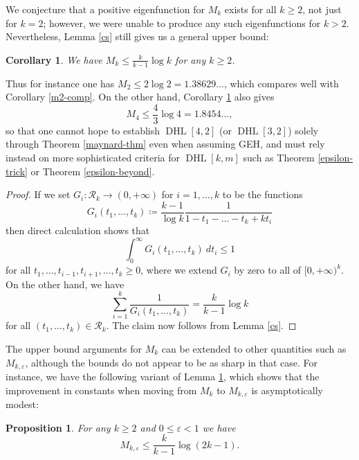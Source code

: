 \documentclass{bmcart}
\DeclareMathOperator*\DHL{DHL}
\theoremstyle{plain}
\newtheorem{proposition}[theorem]{Proposition}
\newtheorem{corollary}[theorem]{Corollary}
\theoremstyle{definition}
\newcommand\eps{\varepsilon}
\begin{document}
We conjecture that a positive eigenfunction for $M_k$ exists for all $k \geq 2$, not just for $k=2$; however, we were unable to produce any such eigenfunctions for $k>2$.  Nevertheless, Lemma \ref{cs} still gives us a general upper bound:

\begin{corollary}\label{mk-upper}  We have $M_k \leq \frac{k}{k-1} \log k$ for any $k \geq 2$.
\end{corollary}

Thus for instance one has $M_2 \leq 2 \log 2 = 1.38629\dots$, which compares well with Corollary \ref{m2-comp}.  On the other hand, Corollary \ref{mk-upper} also gives
$$ M_4 \leq \frac{4}{3} \log 4 = 1.8454\dots, $$
so that one cannot hope to establish $\DHL[4,2]$ (or $\DHL[3,2]$) solely through Theorem \ref{maynard-thm} even when assuming GEH, and must rely instead on more sophisticated criteria for $\DHL[k,m]$ such as Theorem \ref{epsilon-trick} or Theorem \ref{epsilon-beyond}. 

\begin{proof}  If we set $G_i: {\mathcal R}_k \to (0,+\infty)$ for $i=1,\dots,k$ to be the functions
$$ G_i(t_1,\dots,t_k) \coloneqq \frac{k-1}{\log k} \frac{1}{1-t_1-\dots-t_k + kt_i} $$
then direct calculation shows that
$$ \int_0^\infty G_i(t_1,\dots,t_k)\ dt_i \leq 1$$
for all $t_1,\dots,t_{i-1},t_{i+1},\dots,t_k \geq 0$, where we extend $G_i$ by zero to all of $[0,+\infty)^k$.  On the other hand, we have
$$ \sum_{i=1}^k \frac{1}{G_i(t_1,\dots,t_k)} = \frac{k}{k-1} \log k$$
for all $(t_1,\dots,t_k) \in {\mathcal R}_k$.  The claim now follows from Lemma \ref{cs}.
\end{proof}

The upper bound arguments for $M_k$ can be extended to other quantities such as $M_{k,\eps}$, although the bounds do not appear to be as sharp in that case.  For instance, we have the following variant of Lemma \ref{mk-upper}, which shows that the improvement in constants when moving from $M_k$ to $M_{k,\eps}$ is asymptotically modest:

\begin{proposition}\label{mkeps}  For any $k \geq 2$ and $0 \leq \eps < 1$ we have
$$ M_{k,\eps} \leq \frac{k}{k-1} \log(2k-1).$$
\end{proposition}
\end{document}
